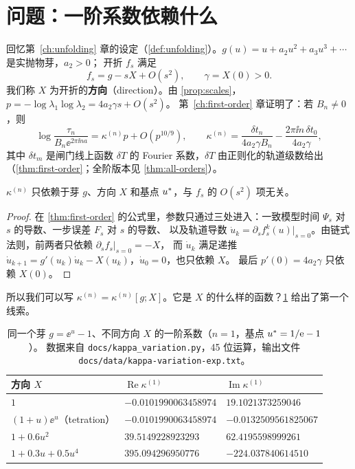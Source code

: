\section{问题：一阶系数依赖什么}\label{ch9:sec:question}

回忆第~\ref{ch:unfolding} 章的设定（\cref{def:unfolding}）。$g(u)=u+a_2u^2+a_3u^3+\cdots$ 是实抛物芽，$a_2>0$；
开折 $f_s$ 满足
\begin{equation}\label{ch9:eq:direction}
 f_s=g-sX+O(s^2),\qquad \gamma=X(0)>0 .
\end{equation}
我们称 $X$ 为开折的\textbf{方向}（direction）。由 \cref{prop:scales}，$p=-\log\lambda_1\log\lambda_2=4a_2\gamma s+O(s^2)$。
第~\ref{ch:first-order} 章证明了：若 $B_n\ne0$，则
\begin{equation}\label{ch9:eq:kappa-recall}
 \log\frac{\tau_n}{B_n\ee^{2\pi\ii na}}=\kappa^{(n)}p+O(p^{10/9}),\qquad
 \kappa^{(n)}=\frac{\delta t_n}{4a_2\gamma B_n}-\frac{2\pi\ii n\,\delta t_0}{4a_2\gamma},
\end{equation}
其中 $\delta t_m$ 是闸门线上函数 $\delta T$ 的 Fourier 系数，$\delta T$ 由正则化的轨道级数给出（\cref{thm:first-order}；全阶版本见 \cref{thm:all-orders}）。

\begin{lemma}\label{ch9:lem:first-jet}
$\kappa^{(n)}$ 只依赖于芽 $g$、方向 $X$ 和基点 $u^{*}$，与 $f_s$ 的 $O(s^2)$ 项无关。
\end{lemma}

\begin{proof}
在 \cref{thm:first-order} 的公式里，参数只通过三处进入：一致模型时间 $\Psi_s$ 对 $s$ 的导数、一步误差 $F_s$ 对 $s$ 的导数、
以及轨道导数 $\dot u_k=\partial_sf_s^k(u)|_{s=0}$。由链式法则，前两者只依赖 $\partial_sf_s|_{s=0}=-X$，
而 $\dot u_k$ 满足递推 $\dot u_{k+1}=g'(u_k)\dot u_k-X(u_k)$，$\dot u_0=0$，也只依赖 $X$。
最后 $p'(0)=4a_2\gamma$ 只依赖 $X(0)$。
\end{proof}

所以我们可以写 $\kappa^{(n)}=\kappa^{(n)}[g;X]$。它是 $X$ 的什么样的函数？\cref{ch9:tab:preview} 给出了第一个线索。

\begin{table}[htbp]
\centering\small
\caption{同一个芽 $g=\ee^u-1$、不同方向 $X$ 的一阶系数（$n=1$，基点 $u^{*}=1/\mathrm{e}-1$）。
数据来自 \texttt{docs/kappa\_variation.py}，45 位运算，输出文件 \texttt{docs/data/kappa-variation-exp.txt}。}
\label{ch9:tab:preview}
\begin{tabular}{lll}
\toprule
方向 $X$ & $\operatorname{Re}\kappa^{(1)}$ & $\operatorname{Im}\kappa^{(1)}$\\
\midrule
$1$ & $-0.0101990063458974$ & $19.1021373259046$\\
$(1+u)\ee^u$（tetration） & $-0.0101990063458974$ & $-0.0132509561825067$\\
$1+0.6u^2$ & $39.5149228923293$ & $62.4195598999261$\\
$1+0.3u+0.5u^4$ & $395.094296950776$ & $-224.037840614510$\\
\bottomrule
\end{tabular}
\end{table}

